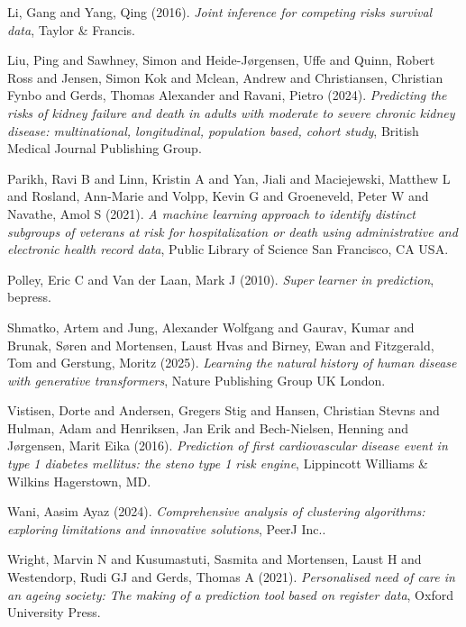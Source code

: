 \documentclass[11pt]{article}
\begin{document}
\noindent
Li, Gang and Yang, Qing (2016). \emph{Joint inference for competing risks survival data}, Taylor \& Francis.

\noindent
Liu, Ping and Sawhney, Simon and Heide-J{\o}rgensen, Uffe and Quinn, Robert Ross and Jensen, Simon Kok and Mclean, Andrew and Christiansen, Christian Fynbo and Gerds, Thomas Alexander and Ravani, Pietro (2024). \emph{Predicting the risks of kidney failure and death in adults with moderate to severe chronic kidney disease: multinational, longitudinal, population based, cohort study}, British Medical Journal Publishing Group.

\noindent
Parikh, Ravi B and Linn, Kristin A and Yan, Jiali and Maciejewski, Matthew L and Rosland, Ann-Marie and Volpp, Kevin G and Groeneveld, Peter W and Navathe, Amol S (2021). \emph{A machine learning approach to identify distinct subgroups of veterans at risk for hospitalization or death using administrative and electronic health record data}, Public Library of Science San Francisco, CA USA.

\noindent
Polley, Eric C and Van der Laan, Mark J (2010). \emph{Super learner in prediction}, bepress.

\noindent
Shmatko, Artem and Jung, Alexander Wolfgang and Gaurav, Kumar and Brunak, S{\o}ren and Mortensen, Laust Hvas and Birney, Ewan and Fitzgerald, Tom and Gerstung, Moritz (2025). \emph{Learning the natural history of human disease with generative transformers}, Nature Publishing Group UK London.

\noindent
Vistisen, Dorte and Andersen, Gregers Stig and Hansen, Christian Stevns and Hulman, Adam and Henriksen, Jan Erik and Bech-Nielsen, Henning and J{\o}rgensen, Marit Eika (2016). \emph{Prediction of first cardiovascular disease event in type 1 diabetes mellitus: the steno type 1 risk engine}, Lippincott Williams \& Wilkins Hagerstown, MD.

\noindent
Wani, Aasim Ayaz (2024). \emph{Comprehensive analysis of clustering algorithms: exploring limitations and innovative solutions}, PeerJ Inc..

\noindent
Wright, Marvin N and Kusumastuti, Sasmita and Mortensen, Laust H and Westendorp, Rudi GJ and Gerds, Thomas A (2021). \emph{Personalised need of care in an ageing society: The making of a prediction tool based on register data}, Oxford University Press.
\end{document}
